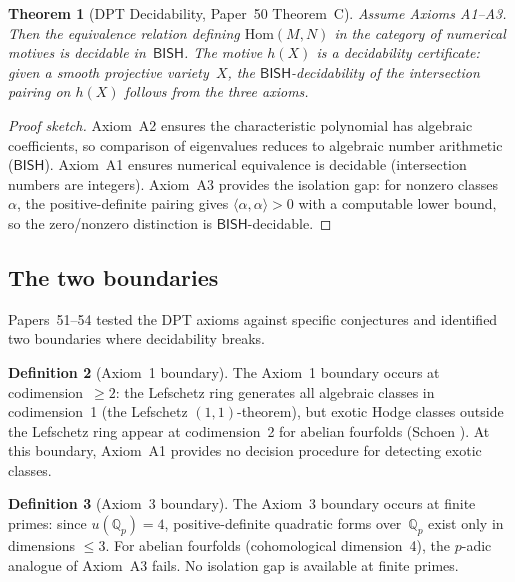 \documentclass[11pt]{article}
\theoremstyle{plain}
\newtheorem{theorem}{Theorem}[section]
\theoremstyle{definition}
\newtheorem{definition}[theorem]{Definition}
\theoremstyle{remark}
\newcommand{\Q}{\mathbb{Q}}
\newcommand{\Qp}{\Q_p}
\newcommand{\Hom}{\mathrm{Hom}}
\newcommand{\BISH}{\mathsf{BISH}}
\begin{document}
\begin{theorem}[DPT Decidability, Paper~50 Theorem~C]\label{thm:dpt}
Assume Axioms A1--A3.  Then the equivalence relation defining
$\Hom(M, N)$ in the category of numerical motives is decidable
in~$\BISH$.  The motive $h(X)$ is a \emph{decidability
certificate}: given a smooth projective variety~$X$, the
$\BISH$-decidability of the intersection pairing on $h(X)$
follows from the three axioms.
\end{theorem}

\begin{proof}[Proof sketch]
Axiom~A2 ensures the characteristic polynomial has algebraic
coefficients, so comparison of eigenvalues reduces to algebraic
number arithmetic ($\BISH$).  Axiom~A1 ensures numerical
equivalence is decidable (intersection numbers are integers).
Axiom~A3 provides the isolation gap: for nonzero classes~$\alpha$,
the positive-definite pairing gives
$\langle \alpha, \alpha \rangle > 0$ with a computable lower
bound, so the zero/nonzero distinction is $\BISH$-decidable.
\end{proof}


\subsection{The two boundaries}

Papers~51--54 tested the DPT axioms against specific conjectures
and identified two boundaries where decidability breaks.

\begin{definition}[Axiom~1 boundary]\label{def:ax1boundary}
The Axiom~1 boundary occurs at codimension~$\ge 2$: the
Lefschetz ring generates all algebraic classes in codimension~1
(the Lefschetz $(1,1)$-theorem), but exotic Hodge classes
outside the Lefschetz ring appear at codimension~2 for abelian
fourfolds (Schoen \cite{Schoen1998}).  At this boundary,
Axiom~A1 provides no decision procedure for detecting exotic
classes.
\end{definition}

\begin{definition}[Axiom~3 boundary]\label{def:ax3boundary}
The Axiom~3 boundary occurs at finite primes: since
$u(\Qp) = 4$, positive-definite quadratic forms over~$\Qp$
exist only in dimensions $\le 3$.  For abelian fourfolds
(cohomological dimension~4), the $p$-adic analogue of Axiom~A3
fails.  No isolation gap is available at finite primes.
\end{definition}
\end{document}
